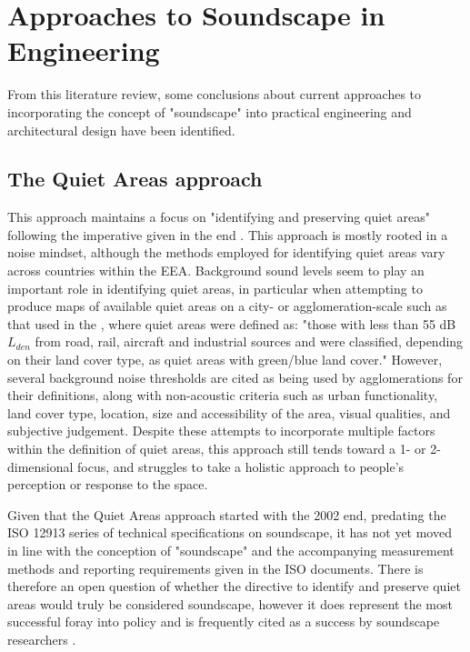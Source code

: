 \section{Approaches to Soundscape in Engineering}

From this literature review, some conclusions about current approaches to incorporating the concept of "soundscape" into practical engineering and architectural design have been identified.

\subsection{The Quiet Areas approach}

This approach maintains a focus on "identifying and preserving quiet areas" \citep{EEA2020Environment} following the imperative given in the \gls{end} \citep{EU2002Directive}. This approach is mostly rooted in a noise mindset, although the methods employed for identifying quiet areas vary across countries within the EEA. Background sound levels seem to play an important role in identifying quiet areas, in particular when attempting to produce maps of available quiet areas on a city- or agglomeration-scale such as that used in the \citet{EEA2020Environment}, where quiet areas were defined as: "those with less than 55 dB $L_{den}$ from road, rail, aircraft and industrial sources and were classified, depending on their land cover type, as quiet areas with green/blue land cover." However, several background noise thresholds are cited as being used by agglomerations for their definitions, along with non-acoustic criteria such as urban functionality, land cover type, location, size and accessibility of the area, visual qualities, and subjective judgement. %
Despite these attempts to incorporate multiple factors within the definition of quiet areas, this approach still tends toward a 1- or 2-dimensional focus, and struggles to take a holistic approach to people's perception or response to the space.

Given that the Quiet Areas approach started with the 2002 \gls{end}, predating the ISO 12913 series of technical specifications on soundscape, it has not yet moved in line with the conception of "soundscape" and the accompanying measurement methods and reporting requirements given in the ISO documents. There is therefore an open question of whether the directive to identify and preserve quiet areas would truly be considered soundscape, however it does represent the most successful foray into policy and is frequently cited as a success by soundscape researchers .


